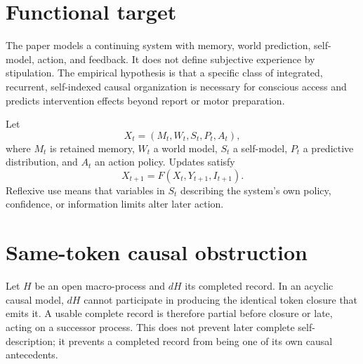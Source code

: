 \documentclass[11pt,a4paper]{article}
\begin{document}
\MakeResearchTitle
\MakeResearchContents
{}
\section{Functional target}
The paper models a continuing system with memory, world prediction, self-model, action, and feedback. It does not define subjective experience by stipulation. The empirical hypothesis is that a specific class of integrated, recurrent, self-indexed causal organization is necessary for conscious access and predicts intervention effects beyond report or motor preparation.

Let
\begin{equation}
X_t=(M_t,W_t,S_t,P_t,A_t),
\end{equation}
where $M_t$ is retained memory, $W_t$ a world model, $S_t$ a self-model, $P_t$ a predictive distribution, and $A_t$ an action policy. Updates satisfy
\begin{equation}
X_{t+1}=F(X_t,Y_{t+1},I_{t+1}).
\end{equation}
Reflexive use means that variables in $S_t$ describing the system's own policy, confidence, or information limits alter later action.

\section{Same-token causal obstruction}
Let $H$ be an open macro-process and $dH$ its completed record. In an acyclic causal model, $dH$ cannot participate in producing the identical token closure that emits it. A usable complete record is therefore partial before closure or late, acting on a successor process. This does not prevent later complete self-description; it prevents a completed record from being one of its own causal antecedents.
\end{document}
